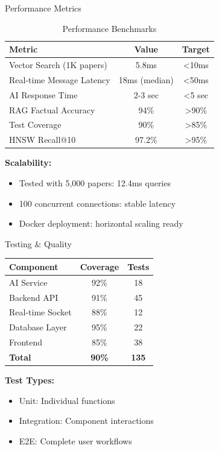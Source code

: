 \documentclass{beamer}
\begin{document}
\begin{frame}{Performance Metrics}

\begin{table}[H]
\centering
\begin{tabular}{|l|c|c|}
\hline
\textbf{Metric} & \textbf{Value} & \textbf{Target} \\
\hline
Vector Search (1K papers) & 5.8ms & <10ms \\
Real-time Message Latency & 18ms (median) & <50ms \\
AI Response Time & 2-3 sec & <5 sec \\
RAG Factual Accuracy & 94\% & >90\% \\
Test Coverage & 90\% & >85\% \\
HNSW Recall@10 & 97.2\% & >95\% \\
\hline
\end{tabular}
\caption{Performance Benchmarks}
\end{table}

\vspace{0.3cm}

\textbf{Scalability:}
\begin{itemize}
    \item Tested with 5,000 papers: 12.4ms queries
    \item 100 concurrent connections: stable latency
    \item Docker deployment: horizontal scaling ready
\end{itemize}

\end{frame}

\begin{frame}{Testing \& Quality}

\begin{table}[H]
\centering
\begin{tabular}{|l|c|c|}
\hline
\textbf{Component} & \textbf{Coverage} & \textbf{Tests} \\
\hline
AI Service & 92\% & 18 \\
Backend API & 91\% & 45 \\
Real-time Socket & 88\% & 12 \\
Database Layer & 95\% & 22 \\
Frontend & 85\% & 38 \\
\hline
\textbf{Total} & \textbf{90\%} & \textbf{135} \\
\hline
\end{tabular}
\end{table}

\vspace{0.3cm}

\textbf{Test Types:}
\begin{itemize}
    \item Unit: Individual functions
    \item Integration: Component interactions
    \item E2E: Complete user workflows
\end{itemize}

\end{frame}
\end{document}
